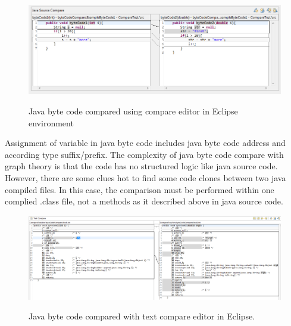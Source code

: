 \documentclass{report}
\begin{document}
\begin{figure}[h]
  \centering
  \includegraphics[scale = 0.55]{Figures/bytecode-compare/example-of-bytecode-text-compared}\\[0.1cm]
  \caption[Java byte code compared in Eclipse text compare editor]{Java byte code compared using compare editor in Eclipse environment}
  \label{fig:example-of-bytecode-text-compared}
\end{figure}

Assignment of variable in java byte code includes java byte code address and according type suffix/prefix. The complexity of java byte code compare with graph theory is that the code has no structured logic like java source code. However, there are some clues hot to find some code clones between two java compiled files. In this case, the comparison must be performed within one complied .class file, not a methods as it described above in java source code.

\begin{figure}[h]
  \centering
  \includegraphics[scale = 0.4]{Figures/bytecode-compare/example-of-bytecode-original-compared}\\[0.1cm]
  \caption[Java byte code compared with text compare editor in Eclipse]{Java byte code compared with text compare editor in Eclipse.}
  \label{fig:example-of-bytecode-original-compared}
\end{figure}
\end{document}
